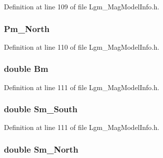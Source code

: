 Definition at line 109 of file Lgm\_\-MagModelInfo.h.\hypertarget{struct_lgm___mag_model_info_680815020ea7ef4edf84c04a0d7f1f20}{
\subsubsection[{Pm\_\-North}]{ {\bf Pm\_\-North}}}
\label{struct_lgm___mag_model_info_680815020ea7ef4edf84c04a0d7f1f20}




Definition at line 110 of file Lgm\_\-MagModelInfo.h.\hypertarget{struct_lgm___mag_model_info_8e90af044e680fe06a5f4745ead8b8d7}{
\subsubsection[{Bm}]{\setlength{\rightskip}{0pt plus 5cm}double {\bf Bm}}}
\label{struct_lgm___mag_model_info_8e90af044e680fe06a5f4745ead8b8d7}




Definition at line 111 of file Lgm\_\-MagModelInfo.h.\hypertarget{struct_lgm___mag_model_info_91d445e45d4679505b1a9b5b7cde690c}{
\subsubsection[{Sm\_\-South}]{\setlength{\rightskip}{0pt plus 5cm}double {\bf Sm\_\-South}}}
\label{struct_lgm___mag_model_info_91d445e45d4679505b1a9b5b7cde690c}




Definition at line 111 of file Lgm\_\-MagModelInfo.h.\hypertarget{struct_lgm___mag_model_info_e133118dcb4b4b581ae49086e9d16be3}{
\subsubsection[{Sm\_\-North}]{\setlength{\rightskip}{0pt plus 5cm}double {\bf Sm\_\-North}}}
\label{struct_lgm___mag_model_info_e133118dcb4b4b581ae49086e9d16be3}




